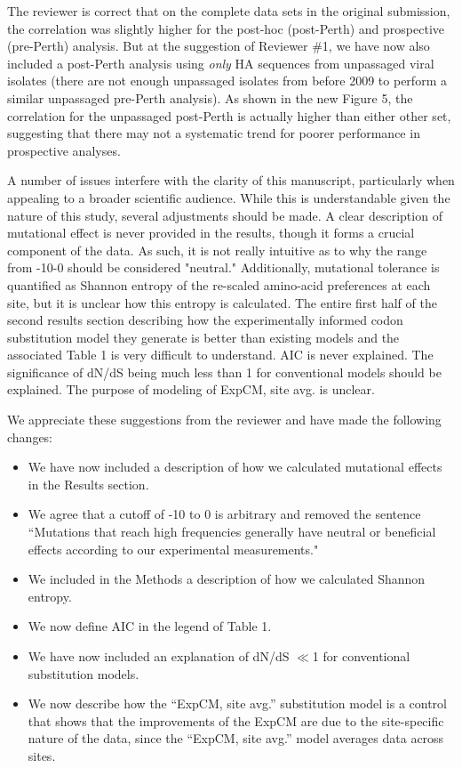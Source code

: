 \documentclass[11pt, oneside]{article}   	%
\newcommand{\response}[1]{{\color{black}#1}}
\begin{document}
\response{
The reviewer is correct that on the complete data sets in the original submission, the correlation was slightly higher for the post-hoc (post-Perth) and prospective (pre-Perth) analysis.
But at the suggestion of Reviewer \#1, we have now also included a post-Perth analysis using \emph{only} HA sequences from unpassaged viral isolates (there are not enough unpassaged isolates from before 2009 to perform a similar unpassaged pre-Perth analysis).
As shown in the new Figure 5, the correlation for the unpassaged post-Perth is actually higher than either other set, suggesting that there may not a systematic trend for poorer performance in prospective analyses.
}

A number of issues interfere with the clarity of this manuscript, particularly when appealing to a broader scientific audience. While this is understandable given the nature of this study, several adjustments should be made. A clear description of mutational effect is never provided in the results, though it forms a crucial component of the data. As such, it is not really intuitive as to why the range from -10-0 should be considered "neutral." Additionally, mutational tolerance is quantified as Shannon entropy of the re-scaled amino-acid preferences at each site, but it is unclear how this entropy is calculated. The entire first half of the second results section describing how the experimentally informed codon substitution model they generate is better than existing models and the associated Table 1 is very difficult to understand. AIC is never explained. The significance of dN/dS being much less than 1 for conventional models should be explained. The purpose of modeling of ExpCM, site avg. is unclear. 

\response{We appreciate these suggestions from the reviewer and have made the following changes:
\begin{itemize}
\item We have now included a description of how we calculated mutational effects in the Results section.
\item We agree that a cutoff of -10 to 0 is arbitrary and removed the sentence ``Mutations that reach high frequencies generally have neutral or beneficial effects according to our experimental measurements." 
\item We included in the Methods a description of how we calculated Shannon entropy.
\item We now define AIC in the legend of Table 1.
\item We have now included an explanation of dN/dS $\ll$1 for conventional substitution models.
\item We now describe how the ``ExpCM, site avg.'' substitution model is a control that shows that the improvements of the ExpCM are due to the site-specific nature of the data, since the ``ExpCM, site avg.'' model averages data across sites.
\end{itemize}
}
\end{document}
